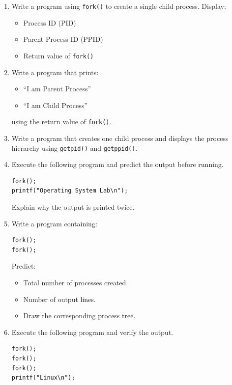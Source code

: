 \documentclass[12pt,a4paper]{article}
\begin{document}
\begin{enumerate}

\item Write a program using \texttt{fork()} to create a single child process. Display:
\begin{itemize}
    \item Process ID (PID)
    \item Parent Process ID (PPID)
    \item Return value of \texttt{fork()}
\end{itemize}

\item Write a program that prints:
\begin{itemize}
    \item ``I am Parent Process''
    \item ``I am Child Process''
\end{itemize}
using the return value of \texttt{fork()}.

\item Write a program that creates one child process and displays the process hierarchy using \texttt{getpid()} and \texttt{getppid()}.

\item Execute the following program and predict the output before running.

\begin{lstlisting}
fork();
printf("Operating System Lab\n");
\end{lstlisting}

Explain why the output is printed twice.

\item Write a program containing:

\begin{lstlisting}
fork();
fork();
\end{lstlisting}

Predict:
\begin{itemize}
    \item Total number of processes created.
    \item Number of output lines.
    \item Draw the corresponding process tree.
\end{itemize}

\item Execute the following program and verify the output.

\begin{lstlisting}
fork();
fork();
fork();
printf("Linux\n");
\end{lstlisting}


\end{enumerate}
\end{document}
